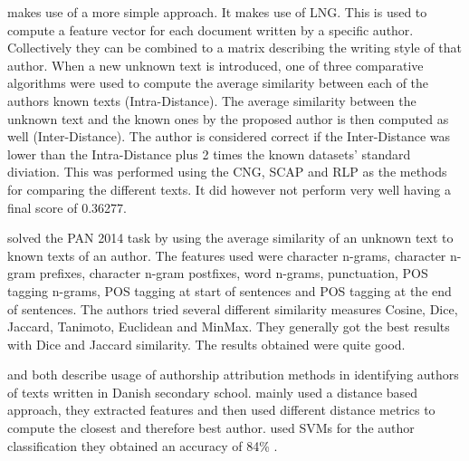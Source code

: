 \cite{layton:2014} makes use of a more simple approach. It makes use of
\gls{LNG}. This is used to compute a feature vector for each document written
by a specific author. Collectively they can be combined to a matrix describing
the writing style of that author. When a new unknown text is introduced, one of
three comparative algorithms were used to compute the average similarity between
each of the authors known texts (Intra-Distance). The average similarity between
the unknown text and the known ones by the proposed author is then computed as
well (Inter-Distance). The author is considered correct if the Inter-Distance
was lower than the Intra-Distance plus 2 times the known datasets' standard
diviation. This was performed using the \gls{CNG}, \gls{SCAP} and \gls{RLP} as
the methods for comparing the different texts. It did however not perform very
well having a final score of 0.36277.

\cite{castro2015} solved the PAN 2014 task by using the average similarity of
an unknown text to known texts of an author. The features used were character
n-grams, character n-gram prefixes, character n-gram postfixes, word n-grams,
punctuation, \gls{POS} tagging n-grams, \gls{POS} tagging at start of sentences
and \gls{POS} tagging at the end of sentences. The authors tried several
different similarity measures Cosine, Dice, Jaccard, Tanimoto, Euclidean and
MinMax. They generally got the best results with Dice and Jaccard similarity.
The results obtained were quite good.

\cite{hansen2014} and \cite{aalykke2016} both describe usage of authorship
attribution methods in identifying authors of texts written in Danish secondary
school. \cite{aalykke2016} mainly used a distance based approach, they extracted
features and then used different distance metrics to compute the closest and
therefore best author. \cite{hansen2014} used \gls{SVM}s for the author
classification they obtained an accuracy of 84\% .
